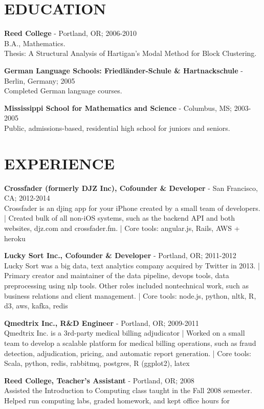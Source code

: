 \documentclass[11pt, line, margin]{res}
\newcommand{\prettysection}[1]{\setromanfont{TitilliumTitle20}\section{#1}\setromanfont{TitilliumText22L}}
\begin{document}

\begin{resume}
\prettysection{EDUCATION}
{\bf Reed College} -  Portland, OR; 2006-2010 \\ 
B.A., Mathematics. \\
Thesis: A Structural Analysis of Hartigan's Modal Method for Block
Clustering.

{\bf German Language Schools: Friedl\"{a}nder-Schule \& Hartnackschule} - Berlin, Germany; 2005 \\
Completed German language courses.

{\bf Mississippi School for Mathematics and Science} - Columbus, MS; 2003-2005 \\ 
Public, admissions-based, residential high school for juniors and seniors. 

\prettysection{EXPERIENCE}

{\bf Crossfader (formerly DJZ Inc), Cofounder & Developer} - San Francisco, CA; 2012-2014 \\
Crossfader is an djing app for your iPhone created by a small team of
developers. | Created bulk of all non-iOS systems, such as the backend
API and both websites, djz.com and crossfader.fm. | Core tools:
angular.js, Rails, AWS + heroku

{\bf Lucky Sort Inc., Cofounder & Developer} - Portland, OR; 2011-2012 \\
Lucky Sort was a big data, text analytics company acquired by
Twitter in 2013. | Primary creator and maintainer of the data pipeline,
devops tools, data preprocessing using nlp tools.  Other roles
included nontechnical work, such as business relations and client
management. | Core tools: node.js, python, nltk, R, d3, aws, kafka, redis

{\bf Qmedtrix Inc., R\&D Engineer} - Portland, OR; 2009-2011 \\
Qmedtrix Inc. is a 3rd-party medical billing adjudicator | Worked on a small team to develop a scalable platform for medical billing operations, such as fraud detection, adjudication,
pricing, and automatic report generation.  | Core tools: Scala,
python, redis, rabbitmq, postgres, R (ggplot2), latex

{\bf Reed College, Teacher's Assistant} - Portland, OR;
2008 \\
Assisted the Introduction to Computing class taught in the Fall 2008
semester. Helped run computing labs, graded homework, and kept office hours for



\end{resume}
\end{document}
